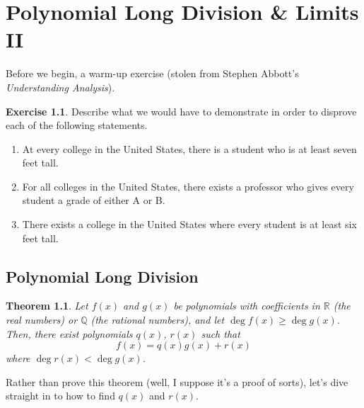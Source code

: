 \documentclass[english]{book}
\newcommand{\RR}{\mathbb{R}}
\newcommand{\QQ}{\mathbb{Q}}
\newtheorem{theorem}{Theorem}[section]
\theoremstyle{remark}
\theoremstyle{definition}
\newtheorem{excs}{Exercise}
\newtheorem*{next week}{Next Week}
\begin{document}
\chapter{Polynomial Long Division \& Limits II}
\setcounter{section}{-1}
Before we begin, a warm-up exercise (stolen from Stephen Abbott's \emph{Understanding Analysis}).
\begin{excs}
Describe what we would have to demonstrate in order to disprove each of the following statements.\begin{enumerate}

\item At every college in the United States, there is a student who is at least seven feet tall.
\item For all colleges in the United States, there exists a professor who gives every student a grade of either A or B.
\item There exists a college in the United States where every student is at least
six feet tall.\end{enumerate}
\end{excs}
\section{Polynomial Long Division}
\begin{theorem}
	Let $f(x)$ and $g(x)$ be polynomials with coefficients in $\RR$ (the real numbers) or $\QQ$ (the rational numbers), and let $\deg f(x)\geq \deg g(x)$. Then, there exist polynomials  $q(x)$, $r(x)$ such that $$f(x)=q(x)g(x)+r(x)$$ where $\deg r(x)<\deg g(x)$. 
 \end{theorem}
Rather than prove this theorem (well, I suppose it's a proof of sorts), let's dive straight in to how to find $q(x)$ and $r(x)$.
\end{document}
